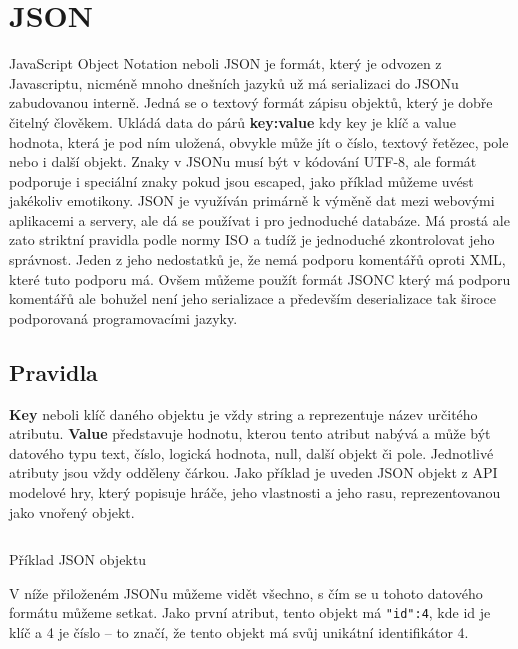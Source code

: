 \section{JSON}\label{sec:formats:json}
JavaScript Object Notation neboli JSON je formát, který je odvozen z Javascriptu, nicméně mnoho dnešních jazyků už má serializaci do JSONu zabudovanou interně. Jedná se o textový formát zápisu objektů, který je dobře čitelný člověkem. Ukládá data do párů \textbf{key:value} kdy key je klíč a value hodnota, která je pod ním uložená, obvykle může jít o číslo, textový řetězec, pole nebo i další objekt. Znaky v JSONu musí být v kódování UTF-8, ale formát podporuje i speciální znaky pokud jsou escaped, jako příklad můžeme uvést jakékoliv emotikony. JSON je využíván primárně k výměně dat mezi webovými aplikacemi a servery, ale dá se používat i pro jednoduché databáze. Má prostá ale zato striktní pravidla podle normy ISO \cite[ISO21778]{ISO71616} a tudíž je jednoduché zkontrolovat jeho správnost. Jeden z jeho nedostatků je, že nemá podporu komentářů oproti XML, které tuto podporu má. Ovšem můžeme použít formát JSONC který má podporu komentářů ale bohužel není jeho serializace a především deserializace tak široce podporovaná programovacími jazyky.\cite[]{enwiki:1217773005}\cite[]{zapierDataFormats}


\subsection{Pravidla}\label{sec:formats:json:rules}
\textbf{Key} neboli klíč daného objektu je vždy string a reprezentuje název určitého atributu. \textbf{Value} představuje hodnotu, kterou tento atribut nabývá a může být datového typu text, číslo, logická hodnota, null, další objekt či pole. Jednotlivé atributy jsou vždy odděleny čárkou. Jako příklad je uveden JSON objekt z API modelové hry, který popisuje hráče, jeho vlastnosti a jeho rasu, reprezentovanou jako vnořený objekt.

\begin{listing}[ht!]
    \inputminted{json}{resources/code/standards/player.json}
    \caption{Příklad JSON objektu}
    \label{code:json_player}
\end{listing}

V níže přiloženém JSONu  můžeme vidět všechno, s čím se u tohoto datového formátu můžeme setkat. Jako první atribut, tento objekt má \verb|"id":4|, kde id je klíč a 4 je číslo -- to značí, že tento objekt má svůj unikátní identifikátor 4.

